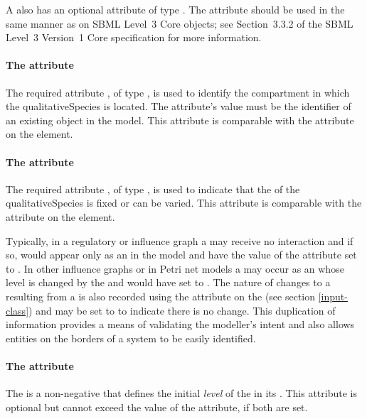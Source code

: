 A \QualitativeSpecies also has an optional  attribute of type . 
 The  attribute should be used
in the same manner as on SBML Level~3 Core
objects; see Section~3.3.2 of the SBML Level~3 Version~1 Core
specification for more information.


\paragraph{The  attribute}
The required attribute , of type , is used to identify the compartment in which the qualitativeSpecies is located.  The attribute's value must be the identifier of an existing  object in the model.  This attribute is comparable with the  attribute on the  element.

\paragraph{The  attribute}
The required attribute , of type , is used to indicate that the  of the qualitativeSpecies is fixed or can be varied. This attribute is comparable with the  attribute on the  element.

Typically, in a regulatory or influence graph a \QualitativeSpecies may receive no interaction and if so, would appear only as an \Input in the model and have the value of the  attribute set to . In other influence graphs or in Petri net models a \QualitativeSpecies may occur as an \Input whose level is changed by the \Transition and would have  set to .  The nature of changes to a \QualitativeSpecies resulting from a \Transition is also recorded using the  attribute on the \Input (see section \ref{input-class}) and may be set to  to indicate there is no change. This duplication of information provides a means of validating the modeller's intent and also allows entities on the borders of a system to be easily identified.
 


\paragraph{The   attribute}
The  is a non-negative  that defines the initial \emph{level} of the \QualitativeSpecies in its . This attribute is optional but cannot exceed the value of the  attribute, if both are set.

